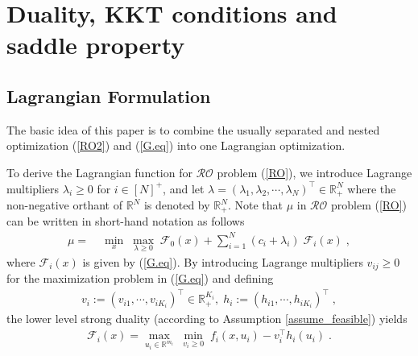 \documentclass[journal,twoside,web]{ieeecolor}
\begin{document}
\section{Duality, KKT conditions and saddle property} \label{section_saddle}

\subsection*{Lagrangian Formulation}
The basic idea of this paper is to combine the usually separated and nested optimization (\ref{RO2}) and (\ref{G.eq}) into one Lagrangian optimization.

To derive the Lagrangian function for $\mathcal{RO}$ problem (\ref{RO}), we introduce Lagrange multipliers $\lambda_i\geq 0$ for $i\in[N]^+$, and let $\lambda=(\lambda_1,\lambda_2,\cdots,\lambda_N)^\top \in \mathbb{R}_+^N$ where the non-negative orthant of $\mathbb{R}^N$ is denoted by $\mathbb{R}_+^N$. Note that $\mu$ in $\mathcal{RO}$ problem (\ref{RO}) can be written in short-hand notation  as follows
\begin{align}
\mu=&\;\underset{x}{\min}\;\underset{\lambda\geq 0}{\max}\; \mathcal{F}_0(x)+\sum_{i=1}^N (c_i+\lambda_i) \; \mathcal{F}_i(x)\;,
 \label{upper_ro}
\end{align}
where $\mathcal{F}_i(x)$ is given by (\ref{G.eq}).
 By introducing Lagrange multipliers $v_{ij} \geq 0$ for the maximization problem in (\ref{G.eq}) and defining
\begin{align*}
v_i:=(v_{i1},\cdots, v_{iK_i})^\top \in \mathbb{R}_+^{K_i},\;h_i:=(h_{i1},\cdots, h_{iK_i})^\top\;,\nonumber
\end{align*}
the lower level strong duality (according to Assumption \ref{assume_feasible}) yields
\begin{align} \label{lower_ro}
\mathcal{F}_i(x)=\underset{u_i\in \mathbb{R}^{m_i}}{\max}\;\underset{v_{i}\geq 0}{\min}\;f_i(x,u_i)-v_i^\top h_{i}(u_i)\;.
\end{align}
\end{document}
